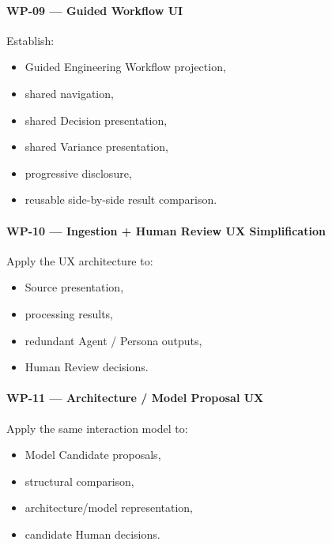\hypertarget{wp-09--guided-workflow-ui}{%
\paragraph{WP-09 --- Guided Workflow UI}\label{wp-09--guided-workflow-ui}}

Establish:

\begin{itemize}
\tightlist
\item
  Guided Engineering Workflow projection,
\item
  shared navigation,
\item
  shared Decision presentation,
\item
  shared Variance presentation,
\item
  progressive disclosure,
\item
  reusable side-by-side result comparison.
\end{itemize}

\hypertarget{wp-10--ingestion--human-review-ux-simplification}{%
\paragraph{WP-10 --- Ingestion + Human Review UX Simplification}\label{wp-10--ingestion--human-review-ux-simplification}}

Apply the UX architecture to:

\begin{itemize}
\tightlist
\item
  Source presentation,
\item
  processing results,
\item
  redundant Agent / Persona outputs,
\item
  Human Review decisions.
\end{itemize}

\hypertarget{wp-11--architecture--model-proposal-ux}{%
\paragraph{WP-11 --- Architecture / Model Proposal UX}\label{wp-11--architecture--model-proposal-ux}}

Apply the same interaction model to:

\begin{itemize}
\tightlist
\item
  Model Candidate proposals,
\item
  structural comparison,
\item
  architecture/model representation,
\item
  candidate Human decisions.
\end{itemize}

